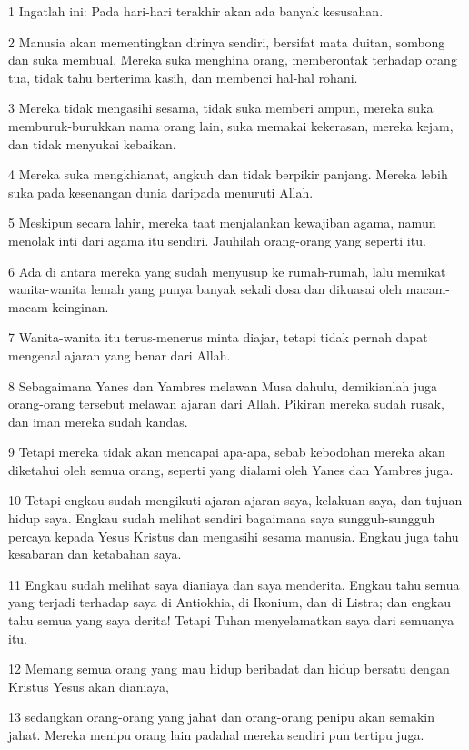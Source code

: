 \par 1 Ingatlah ini: Pada hari-hari terakhir akan ada banyak kesusahan.
\par 2 Manusia akan mementingkan dirinya sendiri, bersifat mata duitan, sombong dan suka membual. Mereka suka menghina orang, memberontak terhadap orang tua, tidak tahu berterima kasih, dan membenci hal-hal rohani.
\par 3 Mereka tidak mengasihi sesama, tidak suka memberi ampun, mereka suka memburuk-burukkan nama orang lain, suka memakai kekerasan, mereka kejam, dan tidak menyukai kebaikan.
\par 4 Mereka suka mengkhianat, angkuh dan tidak berpikir panjang. Mereka lebih suka pada kesenangan dunia daripada menuruti Allah.
\par 5 Meskipun secara lahir, mereka taat menjalankan kewajiban agama, namun menolak inti dari agama itu sendiri. Jauhilah orang-orang yang seperti itu.
\par 6 Ada di antara mereka yang sudah menyusup ke rumah-rumah, lalu memikat wanita-wanita lemah yang punya banyak sekali dosa dan dikuasai oleh macam-macam keinginan.
\par 7 Wanita-wanita itu terus-menerus minta diajar, tetapi tidak pernah dapat mengenal ajaran yang benar dari Allah.
\par 8 Sebagaimana Yanes dan Yambres melawan Musa dahulu, demikianlah juga orang-orang tersebut melawan ajaran dari Allah. Pikiran mereka sudah rusak, dan iman mereka sudah kandas.
\par 9 Tetapi mereka tidak akan mencapai apa-apa, sebab kebodohan mereka akan diketahui oleh semua orang, seperti yang dialami oleh Yanes dan Yambres juga.
\par 10 Tetapi engkau sudah mengikuti ajaran-ajaran saya, kelakuan saya, dan tujuan hidup saya. Engkau sudah melihat sendiri bagaimana saya sungguh-sungguh percaya kepada Yesus Kristus dan mengasihi sesama manusia. Engkau juga tahu kesabaran dan ketabahan saya.
\par 11 Engkau sudah melihat saya dianiaya dan saya menderita. Engkau tahu semua yang terjadi terhadap saya di Antiokhia, di Ikonium, dan di Listra; dan engkau tahu semua yang saya derita! Tetapi Tuhan menyelamatkan saya dari semuanya itu.
\par 12 Memang semua orang yang mau hidup beribadat dan hidup bersatu dengan Kristus Yesus akan dianiaya,
\par 13 sedangkan orang-orang yang jahat dan orang-orang penipu akan semakin jahat. Mereka menipu orang lain padahal mereka sendiri pun tertipu juga.
